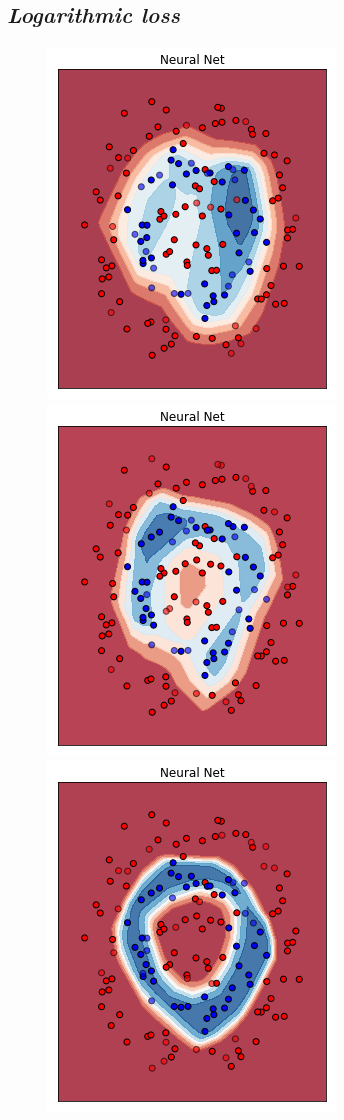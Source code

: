 \documentclass[12pt,a4paper]{report}
\begin{document}
\subsection{\textit{Logarithmic loss}}

\begin{figure}[H]
 \centering
 \includegraphics[scale = 0.35]{images/circle+-rnd-log./1}
 \includegraphics[scale = 0.35]{images/circle+-rnd-log./2}
 \includegraphics[scale = 0.35]{images/circle+-rnd-log./3}

\end{figure}
\end{document}
